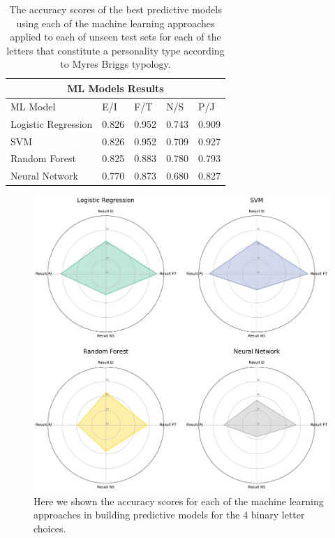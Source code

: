 \documentclass[sigconf, nonacm]{acmart}
\begin{document}
\begin{table}[h!]
\centering
\begin{tabular}{ |p{2.5cm}|p{0.8cm}|p{0.8cm}|p{0.8cm}|p{0.8cm}|  }
 \hline
 \multicolumn{5}{|c|}{ML Models Results} \\
 \hline
ML Model&  E/I & F/T & N/S & P/J\\
 \hline
 Logistic Regression & 0.826 & 0.952 & 0.743 & 0.909\\
 SVM & 0.826 & 0.952 & 0.709 & 0.927\\
 Random Forest & 0.825 & 0.883 & 0.780 & 0.793\\
 Neural Network & 0.770 & 0.873 & 0.680 & 0.827\\
 \hline
\end{tabular}
\caption{The accuracy scores of the best predictive models using each of the machine learning approaches applied to each of unseen test sets for each of the letters that constitute a personality type according to Myres Briggs typology.}


\label{ModelResults}
\end{table}
\begin{figure}[h]
\includegraphics[width=0.9 \columnwidth]{results}
\caption{Here we shown the accuracy scores for each of the machine learning approaches in building predictive models for the 4 binary letter choices. }
\label{fig_ml_models_results}
\end{figure}
\end{document}
